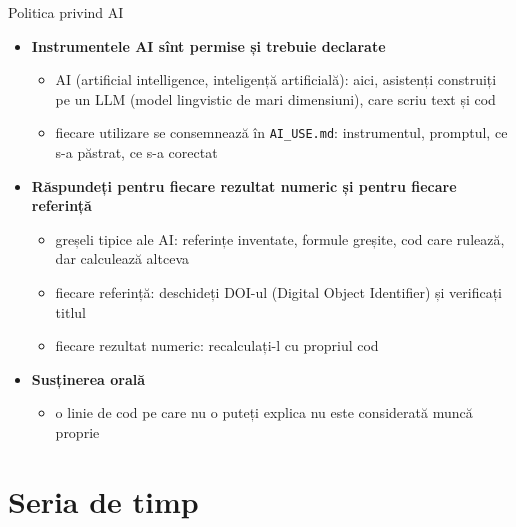 \begin{frame}{Politica privind AI}
\itemsize{\small}
\begin{itemize}
    \item \hypertarget{ch0-ai-policy}{}\textbf{Instrumentele AI sînt permise și trebuie declarate}
    \begin{itemize}
        \item AI (artificial intelligence, inteligență artificială): aici, asistenți construiți pe un LLM (model lingvistic de mari dimensiuni), care scriu text și cod
        \item fiecare utilizare se consemnează în \texttt{AI\_USE.md}: instrumentul, promptul, ce s-a păstrat, ce s-a corectat
    \end{itemize}
    \item \textbf{Răspundeți pentru fiecare rezultat numeric și pentru fiecare referință}
    \begin{itemize}
        \item greșeli tipice ale AI: referințe inventate, formule greșite, cod care rulează, dar calculează altceva
        \item fiecare referință: deschideți DOI-ul (Digital Object Identifier) și verificați titlul
        \item fiecare rezultat numeric: recalculați-l cu propriul cod
    \end{itemize}
    \item \textbf{Susținerea orală}
    \begin{itemize}
        \item o linie de cod pe care nu o puteți explica nu este considerată muncă proprie
    \end{itemize}
\end{itemize}
\end{frame}


\section{Seria de timp}

